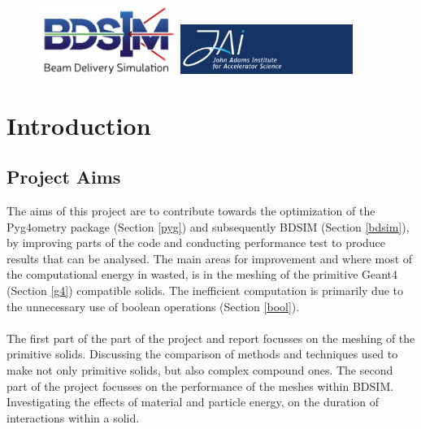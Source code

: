 \documentclass[12pt,a4paper]{article}
\begin{document}
\begin{titlepage}
\begin{figure}[h]
\centering
\begin{minipage}{.6\textwidth}
  \includegraphics[width=0.4\textwidth]{Images//Logos//BDSIM_Logo.jpg}
\end{minipage}%
\begin{minipage}{.6\textwidth}
  \centering
  \includegraphics[width=0.5\textwidth]{Images//Logos//JAI_Logo.jpeg}
  \end{minipage}
\end{figure}

\end{titlepage}
\leavevmode\thispagestyle{empty}\newpage
\tableofcontents
\thispagestyle{empty}
\newpage
\onecolumn

\small
\setcounter{page}{1}


\section{Introduction}

\subsection{Project Aims}
The aims of this project are to contribute towards the optimization of the Pyg4ometry package (Section \ref{pyg}) and subsequently BDSIM (Section \ref{bdsim}), by improving parts of the code and conducting performance test to produce results that can be analysed. The main areas for improvement and where most of the computational energy in wasted, is in the meshing of the primitive Geant4 (Section \ref{g4}) compatible solids. The inefficient computation is primarily due to the unnecessary use of boolean operations (Section \ref{bool}).
\\\\
The first part of the part of the project and report focusses on the meshing of the primitive solids. Discussing the comparison of methods and techniques used to make not only primitive solids, but also complex compound ones. The second part of the project focusses on the performance of the meshes within BDSIM. Investigating the effects of material and particle energy, on the duration of interactions within a solid.
\end{document}

